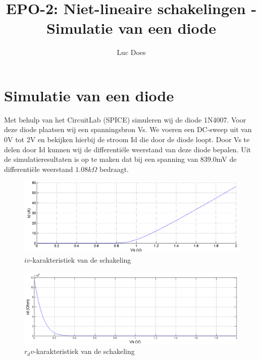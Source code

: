 \documentclass{report}
\title{EPO-2: Niet-lineaire schakelingen - Simulatie van een diode}
\author{Luc Does}
\begin{document}
\chapter{Simulatie van een diode}
\label{ch: Simulatie van een diode}

Met behulp van het CircuitLab (SPICE) simuleren wij de diode 1N4007. Voor deze diode plaatsen wij een spanningsbron Vs. We voeren een DC-sweep uit van 0V tot 2V en bekijken hierbij de stroom Id die door de diode loopt. Door Vs te delen door Id kunnen wij de differentiële weerstand van deze diode bepalen. Uit de simulatieresultaten is op te maken dat bij een spanning van 839.0mV de differentiële weerstand $1.08k\Omega$ bedraagt.
\begin{figure}[H] 
	\centering
	\includegraphics[width=1\textwidth]{diode-iv.png}
	\caption{$iv$-karakteristiek van de schakeling}
	\label{fig:iv}
\end{figure}

\begin{figure}[H]
	\centering
	\includegraphics[width=1\textwidth]{diode-rdv.png}
	\caption{$r_dv$-karakteristiek van de schakeling}
	\label{fig:rdv}
\end{figure}
\end{document}
